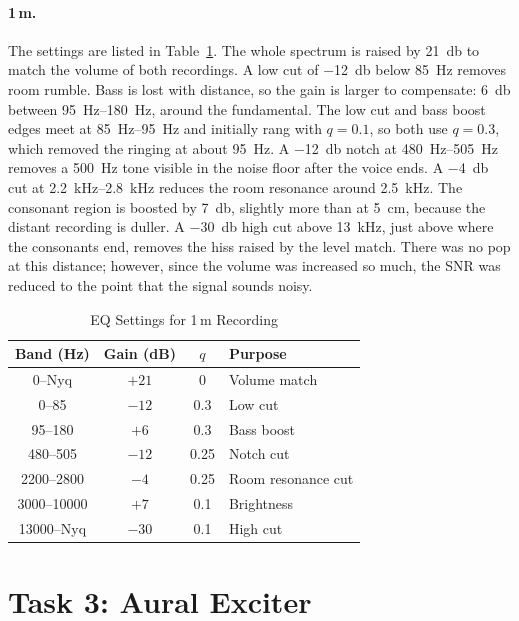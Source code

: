 \documentclass[11pt,a4paper]{article}
\begin{document}
\paragraph{1\,m.}
The settings are listed in Table~\ref{tab:eq_1m}.
The whole spectrum is raised by \SI{+21}{\decibel} to match the volume of both recordings.
A low cut of \SI{-12}{\decibel} below \SI{85}{\hertz} removes room rumble.
Bass is lost with distance, so the gain is larger to compensate: \SI{+6}{\decibel} between \SIrange{95}{180}{\hertz}, around the fundamental.
The low cut and bass boost edges meet at \SIrange{85}{95}{\hertz} and initially rang with $q=0.1$, so both use $q=0.3$, which removed the ringing at about \SI{95}{\hertz}.
A \SI{-12}{\decibel} notch at \SIrange{480}{505}{\hertz} removes a \SI{500}{\hertz} tone visible in the noise floor after the voice ends.
A \SI{-4}{\decibel} cut at \SIrange{2.2}{2.8}{\kilo\hertz} reduces the room resonance around \SI{2.5}{\kilo\hertz}.
The consonant region is boosted by \SI{+7}{\decibel}, slightly more than at \SI{5}{\centi\metre}, because the distant recording is duller.
A \SI{-30}{\decibel} high cut above \SI{13}{\kilo\hertz}, just above where the consonants end, removes the hiss raised by the level match.
There was no pop at this distance; however, since the volume was increased so much, the SNR was reduced to the point that the signal sounds noisy.

\begin{table}[H]
  \centering
  \caption{EQ Settings for 1\,m Recording}
  \label{tab:eq_1m}
  \begin{tabular}{cccl}
    \toprule
    Band (Hz) & Gain (dB) & $q$ & Purpose \\
    \midrule
    0--Nyq       & $+21$ & 0    & Volume match \\
    0--85        & $-12$ & 0.3  & Low cut \\
    95--180      & $+6$  & 0.3  & Bass boost \\
    480--505     & $-12$ & 0.25 & Notch cut\\
    2200--2800   & $-4$  & 0.25 & Room resonance cut\\
    3000--10000  & $+7$  & 0.1  & Brightness \\
    13000--Nyq   & $-30$ & 0.1  & High cut \\
    \bottomrule
  \end{tabular}
\end{table}

\section{Task 3: Aural Exciter}
\end{document}
